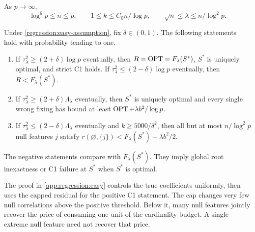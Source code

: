 \begin{assumption}\label{regression:easy-assumption}
As $p\to\infty$,
\begin{equation}\label{regression:easy-regime}
 \log^6p\leq n\leq p,\qquad
 1\leq k\leq C_0n/\log p,\qquad
 \sqrt n\leq\lambda\leq n/\log^2p.
\end{equation}
\end{assumption}

\begin{theorem}
\label{regression:easy-thresholds}
Under \cref{regression:easy-assumption}, fix $\delta\in(0,1)$.
The following statements hold with probability tending to one.
\begin{enumerate}[label=(\alph*)]
\item If $\tau_\lambda^2\geq(2+\delta)\log p$ eventually, then
      $R=\operatorname{OPT}=F_\lambda(S^*)$, $S^*$ is uniquely optimal, and strict C1
      holds. If $\tau_\lambda^2\leq(2-\delta)\log p$ eventually, then
      $R<F_\lambda(S^*)$.
\item If $\tau_\lambda^2\geq(2+\delta)\Lambda_\lambda$ eventually,
      then $S^*$ is uniquely optimal and every single wrong fixing has
      bound at least $\operatorname{OPT}+\lambda b^2/\log p$.
\item If $\tau_\lambda^2\leq(2-\delta)\Lambda_\lambda$ eventually
      and $k\geq5000/\delta^2$, then all but at most $n/\log^2p$ null
      features $j$ satisfy
      $r(\varnothing,\{j\})<F_\lambda(S^*)-\lambda b^2/2$.
\end{enumerate}
The negative statements compare with $F_\lambda(S^*)$. They imply global
root inexactness or C1 failure at $S^*$ when $S^*$ is optimal.
\end{theorem}

The proof in \cref{app:regression:easy} controls the true coefficients
uniformly, then uses the capped residual for the positive C1 statement.
The cap changes very few null correlations above the positive threshold.
Below it, many null features jointly recover the price of consuming one
unit of the cardinality budget. A single extreme null feature need not
recover that price.

